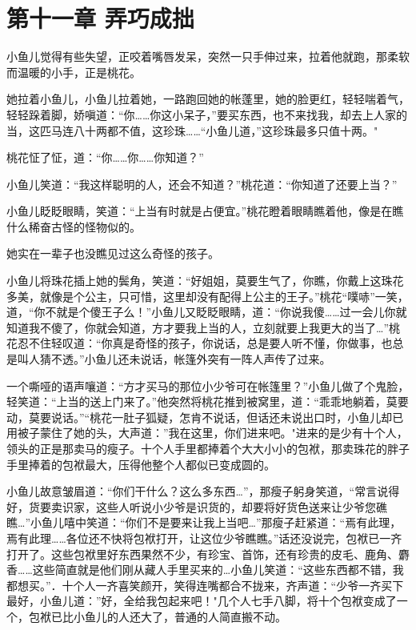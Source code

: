 \documentclass[12pt,oneside]{book}
\begin{document}
\hypertarget{ux7b2cux5341ux4e00ux7ae0-ux5f04ux5de7ux6210ux62d9}{%
\chapter{第十一章
弄巧成拙}\label{ux7b2cux5341ux4e00ux7ae0-ux5f04ux5de7ux6210ux62d9}}

小鱼儿觉得有些失望，正咬着嘴唇发呆，突然一只手伸过来，拉着他就跑，那柔软而温暖的小手，正是桃花。

她拉着小鱼儿，小鱼儿拉着她，一路跑回她的帐蓬里，她的脸更红，轻轻喘着气，轻轻跺着脚，娇嗔道：``你\ldots\ldots 你这小呆子，''要买东西，也不来找我，却去上人家的当，这匹马连八十两都不值，这珍珠\ldots\ldots{}``小鱼儿道，''这珍珠最多只值十两。"

桃花怔了怔，道：``你\ldots\ldots 你\ldots\ldots 你知道？''

小鱼儿笑道：``我这样聪明的人，还会不知道？''桃花道：``你知道了还要上当？''

小鱼儿眨眨眼睛，笑道：``上当有时就是占便宜。''桃花瞪着眼睛瞧着他，像是在瞧什么稀奋古怪的怪物似的。

她实在一辈子也没瞧见过这么奇怪的孩子。

小鱼儿将珠花插上她的鬓角，笑道：``好姐姐，莫要生气了，你瞧，你戴上这珠花多美，就像是个公主，只可惜，这里却没有配得上公主的王子。''桃花``噗哧''一笑，道，``你不就是个傻王子么！''小鱼儿又眨眨眼睛，道：``你说我傻\ldots\ldots 过一会儿你就知道我不傻了，你就会知道，方才要我上当的人，立刻就要上我更大的当了\ldots{}''桃花忍不住轻叹道：``你真是奇怪的孩子，你说话，总是要人听不懂，你做事，也总是叫人猜不透。''小鱼儿还未说话，帐篷外突有一阵人声传了过来。

一个嘶哑的语声嚷道：``方才买马的那位小少爷可在帐篷里？''小鱼儿做了个鬼脸，轻笑道：``上当的送上门来了。''他突然将桃花推到被窝里，道：``乖乖地躺着，莫要动，莫要说话。''``桃花一肚子狐疑，怎肯不说话，但话还未说出口时，小鱼儿却已用被子蒙住了她的头，大声道：''我在这里，你们进来吧。"进来的是少有十个人，领头的正是那卖马的瘦子。十个人手里都捧着个大大小小的包袱，那卖珠花的胖子手里捧着的包袱最大，压得他整个人都似已变成圆的。

小鱼儿故意皱眉道：``你们干什么？这么多东西\ldots{}''，那瘦子躬身笑道，``常言说得好，货要卖识家，这些人听说小少爷是识货的，却要将好货色送来让少爷您礁瞧\ldots{}''小鱼儿嘻中笑道：``你们不是要来让我上当吧\ldots{}''那瘦子赶紧道：``焉有此理，焉有此理\ldots\ldots 各位还不快将包袱打开，让这位少爷瞧瞧。''话还没说完，包袱已一齐打开了。这些包袱里好东西果然不少，有珍宝、首饰，还有珍贵的皮毛、鹿角、麝香\ldots\ldots 这些简直就是他们刚从藏人手里买来的\ldots 小鱼儿笑道：``这些东西都不错，我都想买。''．十个人一齐喜笑颜开，笑得连嘴都合不拢来，齐声道：``少爷一齐买下最好，小鱼儿道：''好，全给我包起来吧！"几个人七手八脚，将十个包袱变成了一个，包袱已比小鱼儿的人还大了，普通的人简直搬不动。
\end{document}

